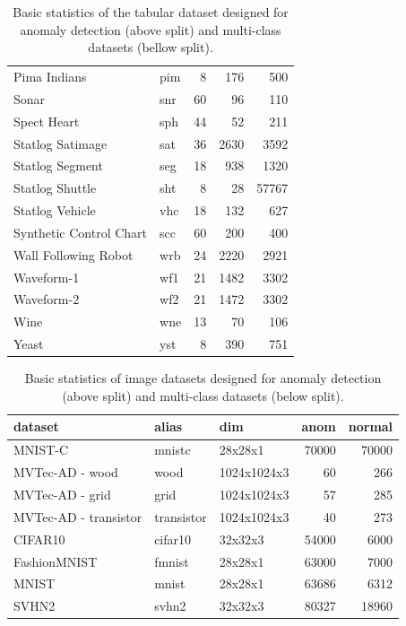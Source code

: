 \begin{table}
\begin{tabular}{llrrr}
Pima Indians & pim & 8 & 176 & 500  \\
Sonar & snr & 60 & 96 & 110  \\
Spect Heart & sph & 44 & 52 & 211  \\
Statlog Satimage & sat & 36 & 2630 & 3592  \\
Statlog Segment & seg & 18 & 938 & 1320  \\
Statlog Shuttle & sht & 8 & 28 & 57767  \\
Statlog Vehicle & vhc & 18 & 132 & 627  \\
Synthetic Control Chart & scc & 60 & 200 & 400  \\
Wall Following Robot & wrb & 24 & 2220 & 2921  \\
Waveform-1 & wf1 & 21 & 1482 & 3302  \\
Waveform-2 & wf2 & 21 & 1472 & 3302  \\
Wine & wne & 13 & 70 & 106  \\
Yeast & yst & 8 & 390 & 751   \\\bottomrule
\end{tabular}
\vspace*{0.15cm}
\caption{Basic statistics of the tabular dataset designed for anomaly detection  (above split) and multi-class datasets  (bellow split).}
\label{tab:tabular_datasets}
\end{table}

\begin{table}
    \centering
    \tabcolsep=0.1cm
    \begin{tabular}{lllrr}
    \toprule
    \textbf{dataset} & \textbf{alias} & \textbf{dim} & \textbf{anom} & \textbf{normal} \\
    \midrule
    MNIST-C & mnistc & 28x28x1 & 70000 & 70000 \\
    MVTec-AD - wood & wood & 1024x1024x3 & 60 & 266 \\
    MVTec-AD - grid & grid & 1024x1024x3 & 57 & 285 \\
    MVTec-AD - transistor & transistor & 1024x1024x3 & 40 & 273 \\
    \midrule
    CIFAR10 & cifar10 & 32x32x3 & 54000 & 6000  \\
    FashionMNIST & fmnist & 28x28x1 & 63000 & 7000   \\
    MNIST & mnist & 28x28x1 & 63686 & 6312  \\
    SVHN2 & svhn2 & 32x32x3 & 80327 & 18960  \\\bottomrule
    \end{tabular}
    \vspace*{0.15cm}
    \caption{Basic statistics of image datasets designed for anomaly detection (above split) and multi-class datasets (below split).}
    \label{tab:image_datasets}
\end{table}


